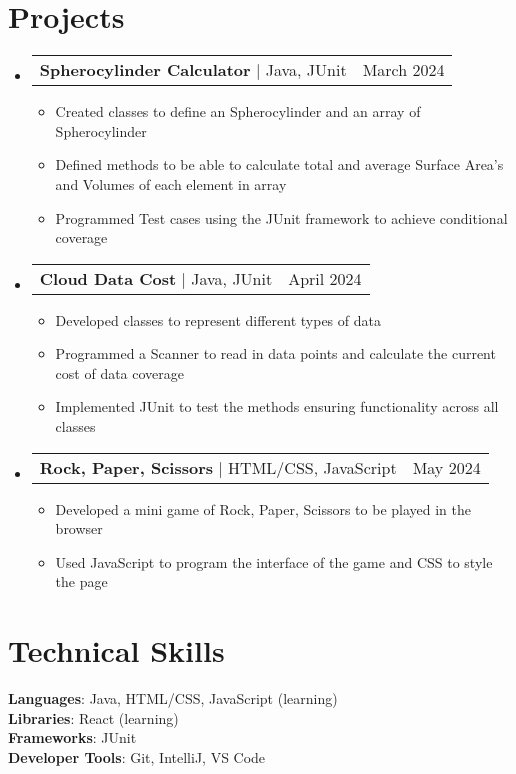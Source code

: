 \documentclass[letterpaper,11pt]{article}
\makeatletter
\newcommand{\resumeItem}[1]{
  \item\small{
    {#1 \vspace{-2pt}}
  }
}
\newcommand{\resumeProjectHeading}[2]{
    \item
    \begin{tabular*}{0.97\textwidth}{l@{\extracolsep{\fill}}r}
      \small#1 & #2 \\
    \end{tabular*}\vspace{-7pt}
}
\newcommand{\resumeSubHeadingListStart}{\begin{itemize}[leftmargin=0.15in, label={}]}
\newcommand{\resumeSubHeadingListEnd}{\end{itemize}}
\newcommand{\resumeItemListStart}{\begin{itemize}}
\newcommand{\resumeItemListEnd}{\end{itemize}\vspace{-5pt}}
\makeatother
\begin{document}
\section{Projects}
    \resumeSubHeadingListStart
        \resumeProjectHeading
        {\textbf {Spherocylinder Calculator} $|$ Java, JUnit}{March 2024}
        \resumeItemListStart
            \resumeItem{Created classes to define an Spherocylinder and an array of Spherocylinder}
            \resumeItem{Defined methods to be able to calculate total and average Surface Area's and Volumes of each element in array}
            \resumeItem{Programmed Test cases using the JUnit framework to achieve conditional coverage}
        \resumeItemListEnd
        \resumeProjectHeading
        {\textbf {Cloud Data Cost} $|$ Java, JUnit}{April 2024}
        \resumeItemListStart
            \resumeItem{Developed classes to represent different types of data}
            \resumeItem{Programmed a Scanner to read in data points and calculate the current cost of data coverage}
            \resumeItem{Implemented JUnit to test the methods ensuring functionality across all classes}
        \resumeItemListEnd
        \resumeProjectHeading
        {\textbf{Rock, Paper, Scissors} $|$ HTML/CSS, JavaScript}{May 2024}
        \resumeItemListStart
            \resumeItem{Developed a mini game of Rock, Paper, Scissors to be played in the browser}
            \resumeItem{Used JavaScript to program the interface of the game and CSS to style the page}
        \resumeItemListEnd
    \resumeSubHeadingListEnd

%
\section{Technical Skills}
 \begin{itemize}[leftmargin=0.15in, label={}]
    \small{\item{
     \textbf{Languages}{: Java, HTML/CSS, JavaScript (learning)} \\
     \textbf{Libraries}{: React (learning)} \\
     \textbf{Frameworks}{: JUnit} \\
     \textbf{Developer Tools}{: Git, IntelliJ, VS Code} \\
    }}
 \end{itemize}


\end{document}
